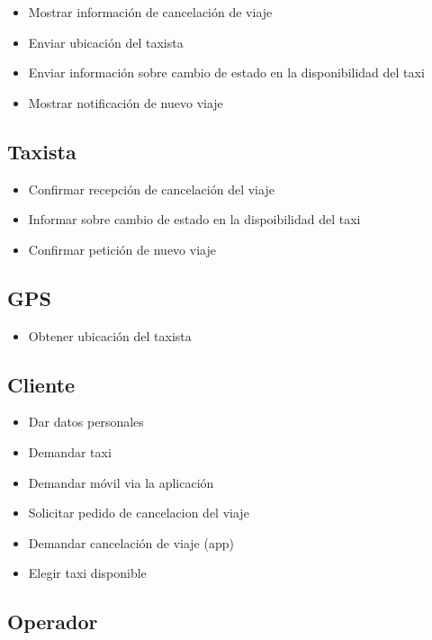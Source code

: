 \documentclass[a4paper]{article}
\begin{document}
\begin{itemize}
 \item Mostrar informaci\'on de cancelaci\'on de viaje
 \item Enviar ubicaci\'on del taxista
 \item Enviar informaci\'on sobre cambio de estado en la disponibilidad del taxi
 \item Mostrar notificaci\'on de nuevo viaje
 
 \end{itemize}

\subsection{Taxista}
\begin{itemize}
 \item Confirmar recepci\'on de cancelaci\'on del viaje
 \item Informar sobre cambio de estado en la dispoibilidad del taxi
 \item Confirmar petici\'on de nuevo viaje
\end{itemize}

\subsection{GPS}
\begin{itemize}
 \item Obtener ubicaci\'on del taxista
\end{itemize}


\subsection{Cliente}
\begin{itemize}
\item Dar datos personales
\item Demandar taxi
\item Demandar m\'ovil via la aplicaci\'on 
\item Solicitar pedido de cancelacion del viaje
\item Demandar cancelaci\'on de viaje (app)
\item Elegir taxi disponible

\end{itemize}

\subsection{Operador}
\end{document}
